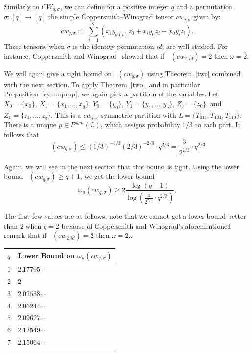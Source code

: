 \documentclass[11pt]{article}
\numberwithin{equation}{section}
\theoremstyle{definition}
\theoremstyle{plain}
\newcommand{\expref}[2]{\hyperref[#2]{#1~\ref{#2}}}
\newcommand{\trr}{\mathop{\tilde{\operatorname{R}}}}
\newcommand{\tsr}{\mathop{\tilde{\operatorname{S}}}}
\theoremstyle{definition}
\begin{document}
Similarly to $CW_{q,\sigma}$, we can define for a positive integer $q$ and a permutation $\sigma : [q] \to [q]$ the simple Coppersmith--Winograd tensor $cw_{q,\sigma}$ given by:
$$cw_{q,\sigma} := \sum_{i=1}^q (x_i y_{\sigma(i)} z_0 + x_i y_0 z_i + x_0 y_i z_i).$$
These tensors, when $\sigma$ is the identity permutation $id$, are well-studied. For instance, Coppersmith and Winograd~\cite{coppersmith} showed that if $\trr(cw_{2,id}) = 2$ then $\omega=2$.

We will again give a tight bound on $\tsr(cw_{q,\sigma})$ using \expref{Theorem}{two} combined with the next section. To apply \expref{Theorem}{two}, and in particular \expref{Proposition}{symmprop}, we again pick a partition of the variables. Let $X_0 = \{ x_0 \}$, $X_1 = \{ x_1, \ldots, x_q \}$, $Y_0 = \{ y_0 \}$, $Y_1 = \{ y_1, \ldots, y_q \}$,  $Z_0 = \{ z_0 \}$, and $Z_1 = \{ z_1, \ldots, z_q \}$. This is a $cw_{q,\sigma}$-symmetric partition with $L = \{ T_{011}, T_{101}, T_{110} \}$. There is a unique $p \in P^{sym}(L)$, which assigns probability $1/3$ to each part. It follows that
$$\tsr(cw_{q,\sigma}) \leq (1/3)^{-1/3} (2/3)^{-2/3} \cdot q^{2/3} = \frac{3}{2^{2/3}} \cdot q^{2/3}.$$

Again, we will see in the next section that this bound is tight. Using the lower bound $\trr(cw_{q,\sigma}) \geq q+1$, we get the lower bound
$$\omega_u(cw_{q,\sigma}) \geq 2 \frac{\log(q+1) }{ \log\left(\frac{3}{2^{2/3}} \cdot q^{2/3}\right)}.$$

The first few values are as follows; note that we cannot get a lower bound better than $2$ when $q=2$ because of Coppersmith and Winograd's aforementioned remark that if $\trr(cw_{2,id}) = 2$ then $\omega=2$..

\begin{center}
\begin{tabular}{l|l}
$q$ & Lower Bound on $\omega_u(cw_{q,\sigma})$ \\ \hline
$1$                                & $2.17795\cdots$                                                        \\
$2$                                & $2$                                                        \\
$3$                                & $2.02538\cdots$                                                        \\
$4$                                & $2.06244\cdots$                                                        \\
$5$                                & $2.09627\cdots$                                                           \\
$6$                                & $2.12549\cdots$                                                       \\
$7$                                & $2.15064\cdots$                                                   
\end{tabular}
\end{center}
\end{document}
